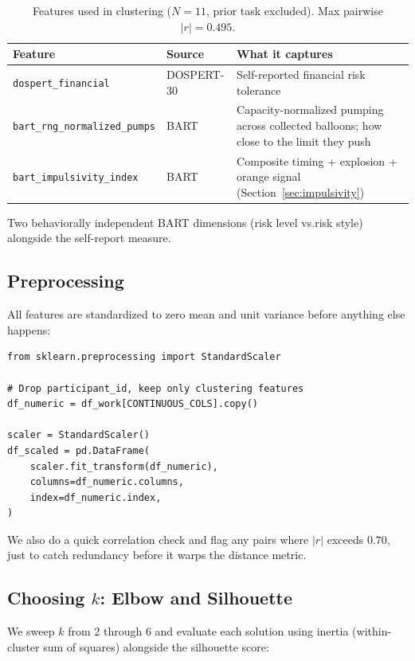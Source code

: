 \documentclass[11pt,a4paper]{article}
\begin{document}
\begin{table}[H]
\centering
\begin{tabular}{@{}llp{7cm}@{}}
\toprule
\textbf{Feature} & \textbf{Source} & \textbf{What it captures} \\
\midrule
\texttt{dospert\_financial}        & DOSPERT-30 & Self-reported financial risk tolerance \\
\texttt{bart\_rng\_normalized\_pumps} & BART    & Capacity-normalized pumping across collected balloons; how close to the limit they push \\
\texttt{bart\_impulsivity\_index}     & BART    & Composite timing + explosion + orange signal (Section~\ref{sec:impulsivity}) \\
\bottomrule
\end{tabular}
\caption{Features used in clustering ($N = 11$, prior task excluded). Max pairwise $|r| = 0.495$.}
\end{table}

Two behaviorally independent BART dimensions (risk level vs.\@ risk style)
alongside the self-report measure.


\subsection{Preprocessing}

All features are standardized to zero mean and unit variance before anything
else happens:

\begin{lstlisting}[style=pythonstyle,caption={Preprocessing (Python).}]
from sklearn.preprocessing import StandardScaler

# Drop participant_id, keep only clustering features
df_numeric = df_work[CONTINUOUS_COLS].copy()

scaler = StandardScaler()
df_scaled = pd.DataFrame(
    scaler.fit_transform(df_numeric),
    columns=df_numeric.columns,
    index=df_numeric.index,
)
\end{lstlisting}

We also do a quick correlation check and flag any pairs where $|r|$ exceeds
$0.70$, just to catch redundancy before it warps the distance metric.


\subsection{Choosing $k$: Elbow and Silhouette}

We sweep $k$ from 2 through 6 and evaluate each solution using inertia
(within-cluster sum of squares) alongside the silhouette score:
\end{document}
